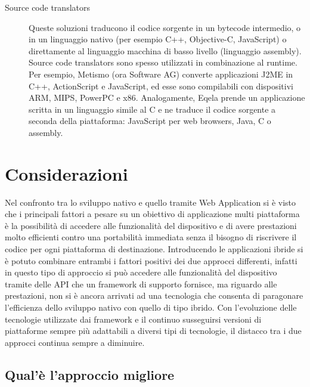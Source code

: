 \begin{description}
\item[Source code translators]
Queste soluzioni traducono il codice sorgente in un bytecode intermedio, o in un linguaggio nativo (per esempio C++, Objective-C, JavaScript) o direttamente al linguaggio macchina di basso livello (linguaggio assembly). Source code translators sono spesso utilizzati in combinazione al runtime. Per esempio, Metismo (ora Software AG) converte applicazioni J2ME in C++, ActionScript e JavaScript, ed esse sono compilabili con dispositivi ARM, MIPS, PowerPC e x86. Analogamente, Eqela prende un applicazione scritta in un linguaggio simile al C e ne traduce il codice sorgente a seconda della piattaforma: JavaScript per web browsers, Java, C o assembly. 
\end{description}


\section{Considerazioni}

Nel confronto tra lo sviluppo nativo e quello tramite Web Application si è visto che i principali fattori a pesare su un obiettivo di applicazione multi piattaforma è la possibilità di accedere alle funzionalità del dispositivo e di avere prestazioni molto efficienti contro una portabilità immediata senza il bisogno di riscrivere il codice per ogni piattaforma di destinazione. 
Introducendo le applicazioni ibride si è potuto combinare entrambi i fattori positivi dei due approcci differenti, infatti in questo tipo di approccio si può accedere alle funzionalità del dispositivo tramite delle API che un framework di supporto fornisce, ma riguardo alle prestazioni, non si è ancora arrivati ad una tecnologia che consenta di paragonare l'efficienza dello sviluppo nativo con quello di tipo ibrido. Con l'evoluzione delle tecnologie utilizzate dai framework e il continuo susseguirsi versioni di piattaforme sempre più adattabili a diversi tipi di tecnologie, il distacco tra i due approcci continua sempre a diminuire.

\subsection{Qual'è l'approccio migliore}

